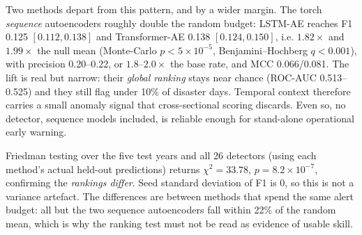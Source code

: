 \documentclass[preprint,12pt]{elsarticle}
\begin{document}
Two methods depart from this pattern, and by a wider margin. The torch
\emph{sequence} autoencoders roughly double the random budget: LSTM-AE reaches
F1 0.125 $[0.112,0.138]$ and Transformer-AE 0.138 $[0.124,0.150]$, i.e.
$1.82\times$ and $1.99\times$ the null mean (Monte-Carlo $p<5\times10^{-5}$,
Benjamini--Hochberg $q<0.001$), with precision 0.20--0.22, or $1.8$--$2.0\times$
the base rate, and MCC 0.066/0.081. The lift is real but narrow: their
\emph{global ranking} stays near chance (ROC-AUC 0.513--0.525) and they still
flag under 10\% of disaster days. Temporal context therefore carries a small
anomaly signal that cross-sectional scoring discards. Even so, no detector,
sequence models included, is reliable enough for stand-alone operational early
warning.

Friedman testing over the five test years and all 26 detectors (using each
method's actual held-out predictions) returns $\chi^2=33.78$,
$p=8.2\times10^{-7}$, confirming the \emph{rankings differ}. Seed standard
deviation of F1 is 0, so this is not a variance artefact. The differences are
between methods that spend the same alert budget: all but the two sequence
autoencoders fall within 22\% of the random mean, which is why the ranking test
must not be read as evidence of usable skill.
\end{document}
